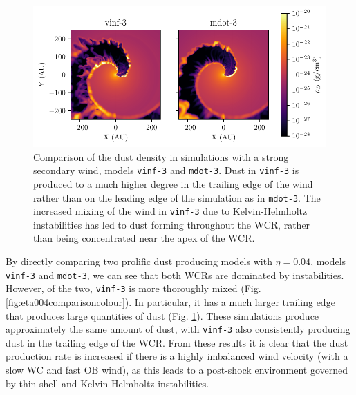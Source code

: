 \documentclass[fleqn,usenatbib]{mnras}
\begin{document}
\begin{figure}
  \centering
  \includegraphics[width=\linewidth]{assets/results/mixed/eta-004-comparison-rhod.pdf}
  \caption[Comparison of dust density in simulations with strong secondary wind]{Comparison of the dust density in simulations with a strong secondary wind, models \texttt{vinf-3} and \texttt{mdot-3}. Dust in \texttt{vinf-3} is produced to a much higher degree in the trailing edge of the wind rather than on the leading edge of the simulation as in \texttt{mdot-3}. The increased mixing of the wind in \texttt{vinf-3} due to Kelvin-Helmholtz instabilities has led to dust forming throughout the WCR, rather than being concentrated near the apex of the WCR.}
  \label{fig:eta004comparisonrhod}
\end{figure}

By directly comparing two prolific dust producing models with $\eta = 0.04$, models \texttt{vinf-3} and \texttt{mdot-3}, we can see that both WCRs are dominated by instabilities.
However, of the two, \texttt{vinf-3} is more thoroughly mixed (Fig. \ref{fig:eta004comparisoncolour}).
In particular, it has a much larger trailing edge that produces large quantities of dust (Fig. \ref{fig:eta004comparisonrhod}).
These simulations produce approximately the same amount of dust, with \texttt{vinf-3} also consistently producing dust in the trailing edge of the WCR.
From these results it is clear that the dust production rate is increased if there is a highly imbalanced wind velocity (with a slow WC and fast OB wind), as this leads to a post-shock environment governed by thin-shell and Kelvin-Helmholtz instabilities.

\end{document}
